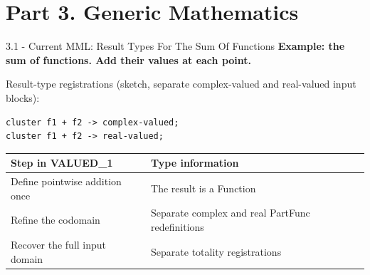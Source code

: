 \documentclass[aspectratio=169,11pt]{beamer}
\begin{document}
\section{Part 3. Generic Mathematics}
\begin{frame}[fragile,t]{3.1 - Current MML: Result Types For The Sum Of Functions}
\textcolor{blue!55!black}{\textbf{Example: the sum of functions. Add their values at each point.}}

Result-type registrations (sketch, separate complex-valued and real-valued input blocks):

\begin{lstlisting}[language={mizar},basicstyle=\ttfamily\small]
cluster f1 + f2 -> complex-valued;
cluster f1 + f2 -> real-valued;
\end{lstlisting}
\begin{footnotesize}
\setlength{\tabcolsep}{3pt}
\renewcommand{\arraystretch}{1.15}
\begin{tabularx}{\textwidth}{>{\raggedright\arraybackslash}X>{\raggedright\arraybackslash}X}
\toprule
\textbf{Step in VALUED\_1} & \textbf{Type information} \\
\midrule
Define pointwise addition once & The result is a Function \\
Refine the codomain & Separate complex and real PartFunc redefinitions \\
Recover the full input domain & Separate totality registrations \\
\bottomrule
\end{tabularx}
\end{footnotesize}


\end{frame}
\end{document}
